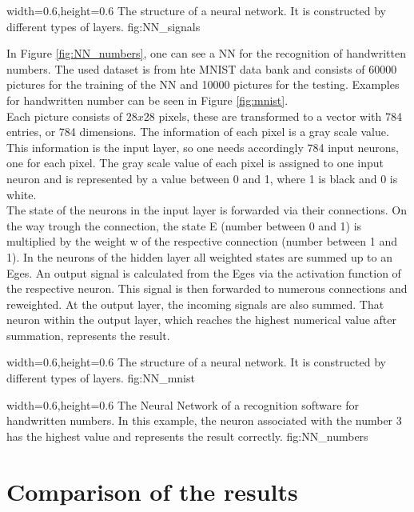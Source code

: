   {width=0.6\textwidth,height=0.6\textheight}%
  {The structure of a neural network. It is constructed by different types of layers. \cite{ZesarBewusstsein} }%
  {}%
  {fig:NN_signals}%
  
In Figure \ref{fig:NN_numbers}, one can see a NN for the recognition of handwritten numbers. The used dataset is from hte MNIST data bank and consists of 60000 pictures for the training of the NN and 10000 pictures for the testing. Examples for handwritten number can be seen in Figure \ref{fig:mnist}. \\
Each picture consists of $28 x 28$ pixels, these are transformed to a vector with 784 entries, or 784 dimensions. The information of each pixel is a gray scale value. This information is the input layer, so one needs accordingly 784 input neurons, one for each pixel. The gray scale value of each pixel is assigned to one input neuron and is represented by a value between 0 and 1, where 1 is black and 0 is white. \\
The state of the neurons in the input layer is forwarded via their connections. On the way trough the connection, the state E (number between 0 and 1) is multiplied by the weight  w of the respective connection (number between 1 and 1). In the neurons of the hidden layer all weighted states are summed up to an Eges. An output signal is calculated from the Eges via the activation function of the respective neuron. This signal is then forwarded to numerous connections and reweighted. At the output layer, the incoming signals are also summed. That neuron within the output layer, which reaches the highest numerical value after summation, represents the result.
  
  {width=0.6\textwidth,height=0.6\textheight}%
  {The structure of a neural network. It is constructed by different types of layers. \cite{ZesarBewusstsein} }%
  {}%
  {fig:NN_mnist}%
  
  
  
  {width=0.6\textwidth,height=0.6\textheight}%
  {The Neural Network of a recognition software for handwritten numbers. In this example, the neuron associated with the number 3 has the highest value and represents the result correctly.}%
  {}%
  {fig:NN_numbers}%
  
\section{Comparison of the results}


